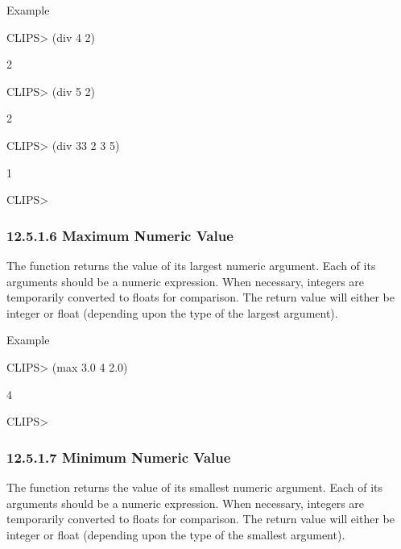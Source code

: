 \documentclass[letterpaper,10pt,english]{sphinxmanual}
\begin{document}

\begin{sphinxVerbatim}[commandchars=\\\{\}]
  
\end{sphinxVerbatim}

Example

CLIPS\textgreater{} (div 4 2)

2

CLIPS\textgreater{} (div 5 2)

2

CLIPS\textgreater{} (div 33 2 3 5)

1

CLIPS\textgreater{}


\subsubsection{12.5.1.6 Maximum Numeric Value}
\label{\detokenize{actions:maximum-numeric-value}}
The  function returns the value of its largest numeric argument.
Each of its arguments should be a numeric expression. When necessary,
integers are temporarily converted to floats for comparison. The return
value will either be integer or float (depending upon the type of the
largest argument).


\begin{sphinxVerbatim}[commandchars=\\\{\}]
 
\end{sphinxVerbatim}

Example

CLIPS\textgreater{} (max 3.0 4 2.0)

4

CLIPS\textgreater{}


\subsubsection{12.5.1.7 Minimum Numeric Value}
\label{\detokenize{actions:minimum-numeric-value}}
The  function returns the value of its smallest numeric argument.
Each of its arguments should be a numeric expression. When necessary,
integers are temporarily converted to floats for comparison. The return
value will either be integer or float (depending upon the type of the
smallest argument).
\end{document}
